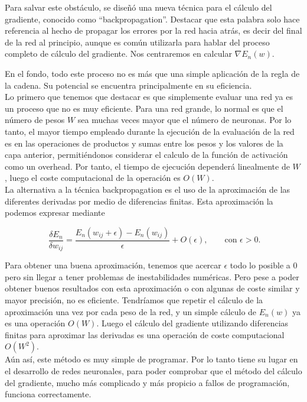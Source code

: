 Para salvar este obstáculo, se diseñó una nueva técnica para el cálculo del gradiente, conocido como ``backpropagation''. Destacar que esta palabra solo hace referencia al hecho de propagar los errores por la red hacia atrás, es decir del final de la red al principio, aunque es común utilizarla para hablar del proceso completo de cálculo del gradiente. Nos centraremos en calcular $\nabla E_n(w)$.\\
 
 
En el fondo, todo este proceso no es más que una simple aplicación de la regla de la cadena. Su potencial se encuentra principalmente en su eficiencia.\\

Lo primero que tenemos que destacar es que simplemente evaluar una red ya es un proceso que no es muy eficiente. Para una red grande, lo normal es que el número de pesos $W$ sea muchas veces mayor que el número de neuronas. Por lo tanto, el mayor tiempo empleado durante la ejecución de la evaluación de la red es en las operaciones de productos y sumas entre los pesos y los valores de la capa anterior, permitiéndonos considerar el calculo de la función de activación como un overhead. Por tanto, el tiempo de ejecución dependerá linealmente de $W$, luego el coste computacional de la operación es $O(W)$.\\

La alternativa a la técnica backpropagation es el uso de la aproximación de las diferentes derivadas por medio de diferencias finitas. Esta aproximación la podemos expresar mediante

\[
\ \frac{\delta E_n}{\delta w_{ij}} = \frac{E_n(w_{ij}+\epsilon) - E_n(w_{ij})}{\epsilon} +O(\epsilon),\qquad\textrm{con }\epsilon>0.
\]

Para obtener una buena aproximación, tenemos que acercar $\epsilon$ todo lo posible a 0 pero sin llegar a tener problemas de inestabilidades numéricas. Pero pese a poder obtener buenos resultados con esta aproximación o con algunas de coste similar y mayor precisión, no es eficiente. Tendríamos que repetir el cálculo de la aproximación una vez por cada peso de la red, y un simple cálculo de $E_n(w)$ ya es una operación $O(W)$. Luego el cálculo del gradiente utilizando diferencias finitas para aproximar las derivadas es una operación de coste computacional $O(W^2)$.\\

Aún así, este método es muy simple de programar. Por lo tanto tiene su lugar en el desarrollo de redes neuronales, para poder comprobar que el método del cálculo del gradiente, mucho más complicado y más propicio a fallos de programación, funciona correctamente.\\

